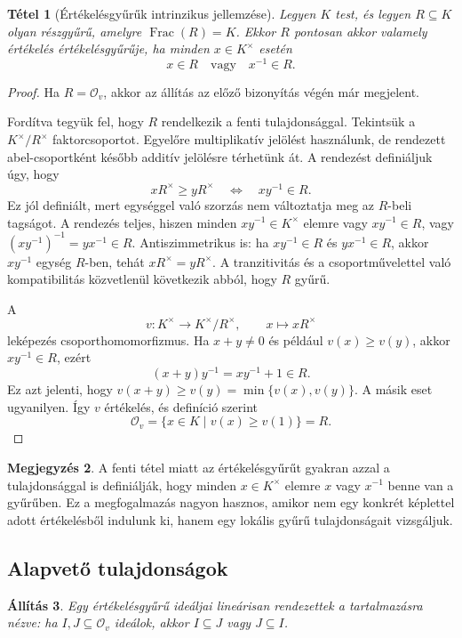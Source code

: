 \documentclass[11pt,a4paper]{article}
\newtheorem{tetel}{Tétel}[section]
\newtheorem{allitas}[tetel]{Állítás}
\theoremstyle{definition}
\newtheorem{megjegyzes}[tetel]{Megjegyzés}
\DeclareMathOperator{\Frac}{Frac}
\newcommand{\OO}{\mathcal O}
\begin{document}
\begin{tetel}[Értékelésgyűrűk intrinzikus jellemzése]
Legyen $K$ test, és legyen $R\subseteq K$ olyan részgyűrű, amelyre
$\Frac(R)=K$. Ekkor $R$ pontosan akkor valamely értékelés
értékelésgyűrűje, ha minden $x\in K^\times$ esetén
\[
  x\in R \quad\text{vagy}\quad x^{-1}\in R.
\]
\end{tetel}

\begin{proof}
Ha $R=\OO_v$, akkor az állítás az előző bizonyítás végén már
megjelent.

Fordítva tegyük fel, hogy $R$ rendelkezik a fenti tulajdonsággal.
Tekintsük a $K^\times/R^\times$ faktorcsoportot. Egyelőre
multiplikatív jelölést használunk, de rendezett abel-csoportként
később additív jelölésre térhetünk át. A rendezést definiáljuk úgy,
hogy
\[
  xR^\times\geq yR^\times
  \quad\Longleftrightarrow\quad
  xy^{-1}\in R.
\]
Ez jól definiált, mert egységgel való szorzás nem változtatja meg az
$R$-beli tagságot. A rendezés teljes, hiszen minden
$xy^{-1}\in K^\times$ elemre vagy $xy^{-1}\in R$, vagy
$(xy^{-1})^{-1}=yx^{-1}\in R$. Antiszimmetrikus is: ha
$xy^{-1}\in R$ és $yx^{-1}\in R$, akkor $xy^{-1}$ egység $R$-ben,
tehát $xR^\times=yR^\times$. A tranzitivitás és a csoportművelettel
való kompatibilitás közvetlenül következik abból, hogy $R$ gyűrű.

A
\[
  v:K^\times\longrightarrow K^\times/R^\times,\qquad
  x\longmapsto xR^\times
\]
leképezés csoporthomomorfizmus. Ha $x+y\neq 0$ és például
$v(x)\geq v(y)$, akkor $xy^{-1}\in R$, ezért
\[
  (x+y)y^{-1}=xy^{-1}+1\in R.
\]
Ez azt jelenti, hogy $v(x+y)\geq v(y)=\min\{v(x),v(y)\}$. A másik
eset ugyanilyen. Így $v$ értékelés, és definíció szerint
\[
  \OO_v=\{x\in K\mid v(x)\geq v(1)\}=R.
\]
\end{proof}

\begin{megjegyzes}
A fenti tétel miatt az értékelésgyűrűt gyakran azzal a
tulajdonsággal is definiálják, hogy minden $x\in K^\times$ elemre
$x$ vagy $x^{-1}$ benne van a gyűrűben. Ez a megfogalmazás nagyon
hasznos, amikor nem egy konkrét képlettel adott értékelésből indulunk
ki, hanem egy lokális gyűrű tulajdonságait vizsgáljuk.
\end{megjegyzes}

\subsection{Alapvető tulajdonságok}

\begin{allitas}
Egy értékelésgyűrű ideáljai lineárisan rendezettek a tartalmazásra
nézve: ha $I,J\subseteq\OO_v$ ideálok, akkor $I\subseteq J$ vagy
$J\subseteq I$.
\end{allitas}
\end{document}
